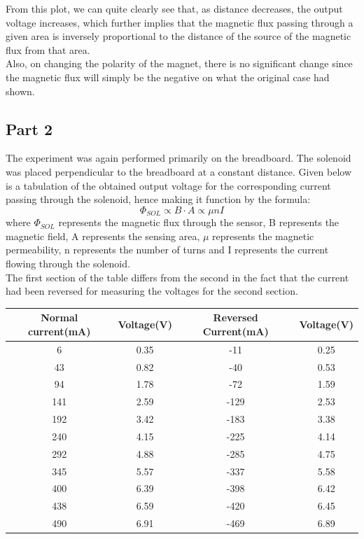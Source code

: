 \documentclass[12pt]{article}
\begin{document}
From this plot, we can quite clearly see that, as distance decreases, the output voltage increases, which further implies that the magnetic flux passing through a given area is inversely proportional to the distance of the source of the magnetic flux from that area.\\
Also, on changing the polarity of the magnet, there is no significant change since the magnetic flux will simply be the negative on what the original case had shown.

\subsection{Part 2}

The experiment was again performed primarily on the breadboard. The solenoid was placed perpendicular to the breadboard at a constant distance. Given below is a tabulation of the obtained output voltage for the corresponding current passing through the solenoid, hence making it function by the formula:
\[ \Phi_{SOL} \propto B\cdot A \propto \mu nI \] where \( \Phi_{SOL} \) represents the magnetic flux through the sensor, B represents the magnetic field, A represents the sensing area, \( \mu \) represents the magnetic permeability, n represents the number of turns and I represents the current flowing through the solenoid.\\
The first section of the table differs from the second in the fact that the current had been reversed for measuring the voltages for the second section.
\begin{table}[h!]
\centering
\begin{tabular}{||c|c||c|c||}
\hline\hline
Normal current(mA) & Voltage(V) & Reversed Current(mA) & Voltage(V)\\ [0.5ex]
\hline\hline
6 & 0.35 & -11 & 0.25 \\
43 & 0.82 & -40 & 0.53 \\
94 & 1.78 & -72 & 1.59 \\
141 & 2.59 & -129 & 2.53 \\
192 & 3.42 & -183 & 3.38 \\
240 & 4.15 & -225 & 4.14 \\
292 & 4.88 & -285 & 4.75 \\
345 & 5.57 & -337 & 5.58 \\
400 & 6.39 & -398 & 6.42 \\
438 & 6.59 & -420 & 6.45 \\
490 & 6.91 & -469 & 6.89 \\ [1ex]
\hline\hline
\end{tabular}
\end{table}
\end{document}
